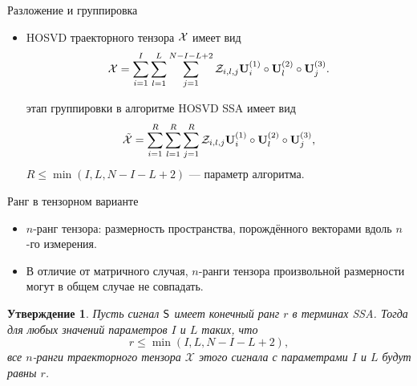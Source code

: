 \documentclass[ucs, notheorems, handout]{beamer}
\newcommand{\bluetext}[1]{{\usebeamercolor[fg]{bluetext_color}#1}}
\newtheorem{statement}{Утверждение}
\begin{document}
    \begin{frame}{Разложение и группировка}
        \begin{itemize}
            \item HOSVD траекторного тензора $\mathcal{X}$ имеет вид
            \[
                \mathcal{X} = \sum_{i=1}^{I} \sum_{l=1}^{L} \sum_{j=1}^{N-I-L+2} \mathcal{Z}_{i,l,j} \mathbf{U}^{(1)}_{i}
                \circ \mathbf{U}^{(2)}_{l} \circ \mathbf{U}^{(3)}_{j}.
            \]

            \vspace{0.6cm}
             этап группировки в алгоритме HOSVD SSA имеет вид
            \[
                \tilde{\mathcal{X}} = \sum_{i=1}^{R} \sum_{l=1}^{R} \sum_{j=1}^{R} \mathcal{Z}_{i,l,j} \mathbf{U}^{(1)}_{i}
                \circ \mathbf{U}^{(2)}_{l} \circ \mathbf{U}^{(3)}_{j},
            \]
            $R\leqslant \min(I, L, N - I - L + 2)$ --- параметр алгоритма.
        \end{itemize}
    \end{frame}
    
        \begin{frame}{Ранг в тензорном варианте}
        \begin{itemize}
            \item \bluetext{$n$-ранг тензора:} размерность пространства, порождённого
            векторами вдоль $n$-го измерения.

            \item В отличие от матричного случая, $n$-ранги тензора произвольной размерности могут в общем случае
            не совпадать.
        \end{itemize}

        \begin{statement}
            Пусть сигнал $\mathsf{S}$ имеет конечный ранг $r$ в терминах \emph{SSA}\@.
            Тогда для любых значений параметров $I$ и $L$ таких, что
            \[
                r\leqslant\min(I, L, N-I-L+2),
            \]
            все $n$-ранги траекторного тензора $\mathcal{X}$
            этого сигнала с параметрами $I$ и $L$ будут равны $r$.
        \end{statement}
    \end{frame}
\end{document}
